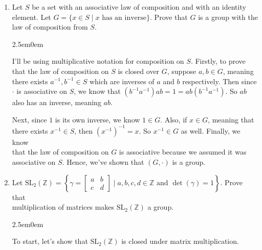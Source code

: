 \documentclass{book}
\newcommand{\exOne}{%
   \color{Purple}%
   \fontsize{13}{15}\selectfont%
}
\newenvironment{myIndent}{%
   \begin{adjustwidth}{2.5em}{0em}%
}{%
   \end{adjustwidth}%
}
\newcommand{\retTwo}{\hfill\bigbreak}
\begin{document}
\begin{enumerate}
	\item Let $S$ be a set with an associative law of composition and with an identity\\ element. Let $G = \{x \in S \mid x \text{ has an inverse}\}$. Prove that $G$ is a group with the law of composition from $S$.
	
	\begin{myIndent}\exOne
		I'll be using multiplicative notation for composition on $S$. Firstly, to prove that the law of composition on $S$ is closed over $G$, suppose $a, b \in G$, meaning there exists $a^{-1}, b^{-1} \in S$ which are inverses of $a$ and $b$ respectively. Then since $\cdot$ is associative on $S$, we know that $(b^{-1}a^{-1})ab = 1 = ab(b^{-1}a^{-1})$. So $ab$ also has an inverse, meaning $ab$.\retTwo
		
		Next, since $1$ is its own inverse, we know $1 \in G$. Also, if $x \in G$, meaning that there exists $x^{-1} \in S$, then $(x^{-1})^{-1} = x$. So $x^{-1} \in G$ as well. Finally, we know\\ that the law of composition on $G$ is associative because we assumed it was associative on $S$. Hence, we've shown that $(G, \cdot)$ is a group.\retTwo
	\end{myIndent}

	\item Let $\mathrm{SL}_2(\mathbb{Z}) = \left\{\gamma = 
	\left[\begin{smallmatrix}
		a & b \\ c & d
	\end{smallmatrix}\right] \mid a, b, c, d \in \mathbb{Z} \text{ and } \det(\gamma) = 1\right\}$. Prove that\\ multiplication of matrices makes $\mathrm{SL}_2(\mathbb{Z})$ a group.

	\begin{myIndent}\exOne
		To start, let's show that $\mathrm{SL}_2(\mathbb{Z})$ is closed under matrix multiplication.
		

\end{myIndent}
\end{enumerate}
\end{document}
